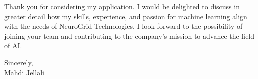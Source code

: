 \documentclass[letterpaper,11pt]{article}
\begin{document}
    Thank you for considering my application. I would be delighted to discuss in greater detail how my skills, experience, and passion for machine learning align with the needs of NeuroGrid Technologies. I look forward to the possibility of joining your team and contributing to the company's mission to advance the field of AI.

    Sincerely,\\[12pt]

    Mahdi Jellali
\end{document}
